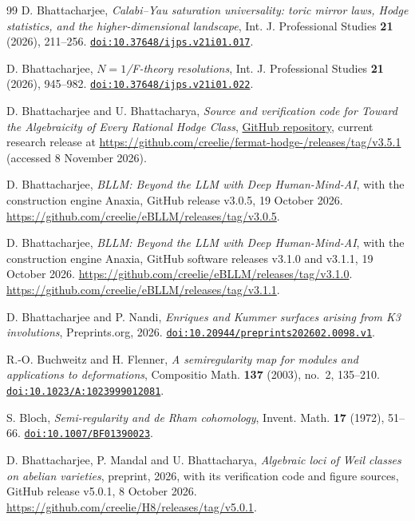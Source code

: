\documentclass[11pt,reqno]{amsart}
\numberwithin{equation}{section}
\theoremstyle{plain}
\theoremstyle{definition}
\newcommand{\codeRelease}{https://github.com/creelie/fermat-hodge-/releases/tag/v3.5.1}
\begin{document}
\begin{thebibliography}{99}
D. Bhattacharjee,
\emph{Calabi--Yau saturation universality: toric mirror laws, Hodge statistics, and the higher-dimensional landscape},
Int. J. Professional Studies \textbf{21} (2026), 211--256.
\href{https://doi.org/10.37648/ijps.v21i01.017}{\nolinkurl{doi:10.37648/ijps.v21i01.017}}.

D. Bhattacharjee,
\emph{$N=1$/F-theory resolutions},
Int. J. Professional Studies \textbf{21} (2026), 945--982.
\href{https://doi.org/10.37648/ijps.v21i01.022}{\nolinkurl{doi:10.37648/ijps.v21i01.022}}.

D. Bhattacharjee and U. Bhattacharya,
\emph{Source and verification code for Toward the Algebraicity of Every Rational Hodge Class},
\href{https://github.com/creelie/fermat-hodge-}{GitHub repository},
current research release at \url{\codeRelease} (accessed 8 November 2026).

D. Bhattacharjee,
\emph{BLLM: Beyond the LLM with Deep Human-Mind-AI}, with the construction engine Anaxia,
GitHub release v3.0.5, 19 October 2026.
\url{https://github.com/creelie/eBLLM/releases/tag/v3.0.5}.

D. Bhattacharjee,
\emph{BLLM: Beyond the LLM with Deep Human-Mind-AI}, with the construction engine Anaxia,
GitHub software releases v3.1.0 and v3.1.1, 19 October 2026.
\url{https://github.com/creelie/eBLLM/releases/tag/v3.1.0}.
\url{https://github.com/creelie/eBLLM/releases/tag/v3.1.1}.

D. Bhattacharjee and P. Nandi,
\emph{Enriques and Kummer surfaces arising from K3 involutions},
Preprints.org, 2026.
\href{https://doi.org/10.20944/preprints202602.0098.v1}{\nolinkurl{doi:10.20944/preprints202602.0098.v1}}.

R.-O. Buchweitz and H. Flenner,
\emph{A semiregularity map for modules and applications to deformations},
Compositio Math. \textbf{137} (2003), no.~2, 135--210.
\href{https://doi.org/10.1023/A:1023999012081}{\nolinkurl{doi:10.1023/A:1023999012081}}.

S. Bloch,
\emph{Semi-regularity and de Rham cohomology},
Invent. Math. \textbf{17} (1972), 51--66.
\href{https://doi.org/10.1007/BF01390023}{\nolinkurl{doi:10.1007/BF01390023}}.

D. Bhattacharjee, P. Mandal and U. Bhattacharya,
\emph{Algebraic loci of Weil classes on abelian varieties},
preprint, 2026, with its verification code and figure sources, GitHub release v5.0.1, 8 October 2026.
\url{https://github.com/creelie/H8/releases/tag/v5.0.1}.


\end{thebibliography}
\end{document}
